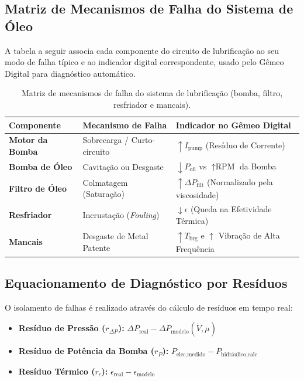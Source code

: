 \documentclass[12pt,a4paper]{article}
\numberwithin{equation}{section}
\numberwithin{table}{section}
\numberwithin{figure}{section}
\begin{document}
	\subsection{\textbf{Matriz de Mecanismos de Falha do Sistema de Óleo}}
	A tabela a seguir associa cada componente do circuito de lubrificação ao seu modo de falha típico e ao indicador digital correspondente, usado pelo Gêmeo Digital para diagnóstico automático.
	\begin{table}[h!]
		\centering
		\small
		\renewcommand{\arraystretch}{1.5}
		\begin{tabular}{|l|l|l|}
			\hline
			\textbf{Componente} & \textbf{Mecanismo de Falha} & \textbf{Indicador no Gêmeo Digital} \\ \hline
			\textbf{Motor da Bomba} & Sobrecarga / Curto-circuito & $\uparrow I_{\text{pump}}$ (Resíduo de Corrente) \\ \hline
			\textbf{Bomba de Óleo} & Cavitação ou Desgaste & $\downarrow P_{\text{oil}}$ vs $\uparrow \text{RPM}$ da Bomba \\ \hline
			\textbf{Filtro de Óleo} & Colmatagem (Saturação) & $\uparrow \Delta P_{\text{filt}}$ (Normalizado pela viscosidade) \\ \hline
			\textbf{Resfriador} & Incrustação (\textit{Fouling}) & $\downarrow \epsilon$ (Queda na Efetividade Térmica) \\ \hline
			\textbf{Mancais} & Desgaste de Metal Patente & $\uparrow T_{\text{brg}}$ e $\uparrow$ Vibração de Alta Frequência \\ \hline
		\end{tabular}
		\caption{Matriz de mecanismos de falha do sistema de lubrificação (bomba, filtro, resfriador e mancais).}
	\end{table}
	
	\subsection{\textbf{Equacionamento de Diagnóstico por Resíduos}}
	O isolamento de falhas é realizado através do cálculo de resíduos em tempo real:
	\begin{itemize}
		\item \textbf{Resíduo de Pressão ($r_{\Delta P}$):} $ \Delta P_{\text{real}} - \Delta P_{\text{modelo}}(\dot{V}, \mu) $
		\item \textbf{Resíduo de Potência da Bomba ($r_{P}$):} $ P_{\text{elec,medido}} - P_{\text{hidráulico,calc}} $
		\item \textbf{Resíduo Térmico ($r_{\epsilon}$):} $ \epsilon_{\text{real}} - \epsilon_{\text{modelo}} $
	\end{itemize}
	
\end{document}
